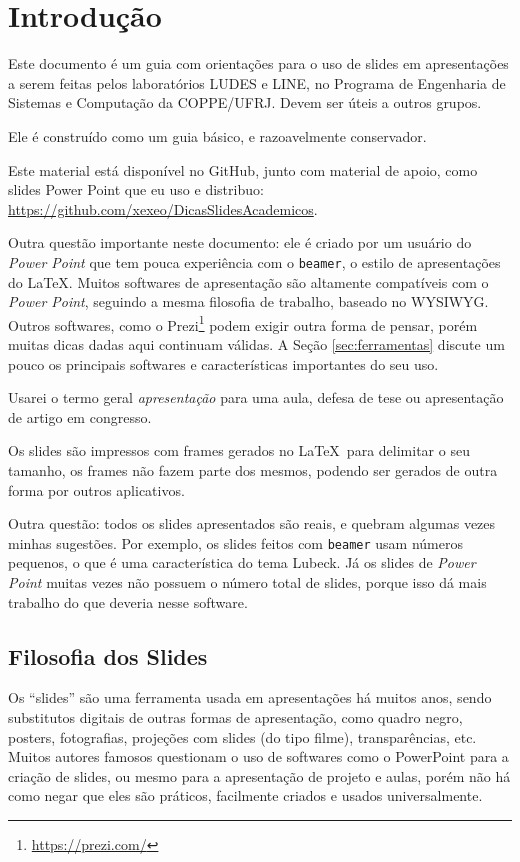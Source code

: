 \section{Introdução}

Este documento é um guia com orientações para o uso de slides em apresentações a serem feitas pelos laboratórios LUDES e LINE, no Programa de Engenharia de Sistemas e Computação da COPPE/UFRJ. Devem ser úteis a outros grupos.

Ele é construído como um guia básico, e razoavelmente conservador.

Este material está disponível no GitHub, junto com material de apoio, como slides Power Point que eu uso e distribuo: \url{https://github.com/xexeo/DicasSlidesAcademicos}.

Outra questão importante neste documento: ele é criado por um usuário do \textit{Power Point} que tem pouca experiência com o \texttt{beamer}, o estilo de apresentações do \LaTeX. Muitos softwares de apresentação são altamente compatíveis com o \textit{Power Point}, seguindo a mesma filosofia de trabalho, baseado no WYSIWYG. Outros softwares, como o Prezi\footnote{\url{https://prezi.com/}} podem exigir outra forma de pensar, porém muitas dicas dadas aqui continuam válidas. A Seção \ref{sec:ferramentas} discute um pouco os principais softwares e características importantes do seu uso.

Usarei o termo geral \textit{apresentação} para uma aula, defesa de tese ou apresentação de artigo em congresso.

Os slides são impressos com frames gerados no \LaTeX\ para delimitar o seu tamanho, os frames não fazem parte dos mesmos, podendo ser gerados de outra forma por outros aplicativos.

Outra questão: todos os slides apresentados são reais, e quebram algumas vezes minhas sugestões. Por exemplo, os slides feitos com \texttt{beamer} usam números pequenos, o que é uma característica do tema Lubeck. Já os slides de \textit{Power Point} muitas vezes não possuem o número total de slides, porque isso dá mais trabalho do que deveria nesse software.

\subsection{Filosofia dos Slides}

Os ``slides'' são uma ferramenta usada em apresentações há muitos anos, sendo substitutos digitais de outras formas de apresentação, como quadro negro, posters, fotografias, projeções com slides (do tipo filme), transparências, etc. Muitos autores famosos questionam o uso de softwares como o PowerPoint para a criação de slides, ou mesmo para a apresentação de projeto e aulas, porém não há como negar que eles são práticos, facilmente criados e usados universalmente.


